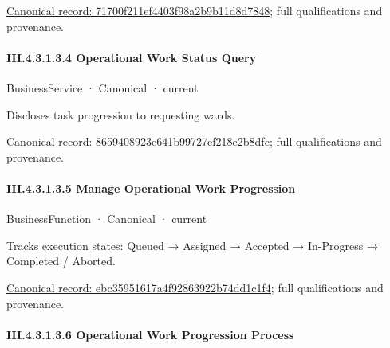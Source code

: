 {\footnotesize \href{../../../../../../../../continuum/business/business-function/71700f211ef4403f98a2b9b11d8d7848.md}{Canonical record: 71700f211ef4403f98a2b9b11d8d7848}; full qualifications and provenance.}\par
\paragraph*{III.4.3.1.3.4 Operational Work Status Query}
\label{navigation:III.4.3.1.3.4}

\label{element:8659408923e641b99727ef218e2b8dfc}
{\small BusinessService · Canonical · current}\par

Discloses task progression to requesting wards.


{\footnotesize \href{../../../../../../../../continuum/business/business-service/8659408923e641b99727ef218e2b8dfc.md}{Canonical record: 8659408923e641b99727ef218e2b8dfc}; full qualifications and provenance.}\par
\paragraph*{III.4.3.1.3.5 Manage Operational Work Progression}
\label{navigation:III.4.3.1.3.5}

\label{element:ebc35951617a4f92863922b74dd1c1f4}
{\small BusinessFunction · Canonical · current}\par

Tracks execution states: Queued → Assigned → Accepted → In-Progress → Completed / Aborted.


{\footnotesize \href{../../../../../../../../continuum/business/business-function/ebc35951617a4f92863922b74dd1c1f4.md}{Canonical record: ebc35951617a4f92863922b74dd1c1f4}; full qualifications and provenance.}\par
\paragraph*{III.4.3.1.3.6 Operational Work Progression Process}
\label{navigation:III.4.3.1.3.6}

